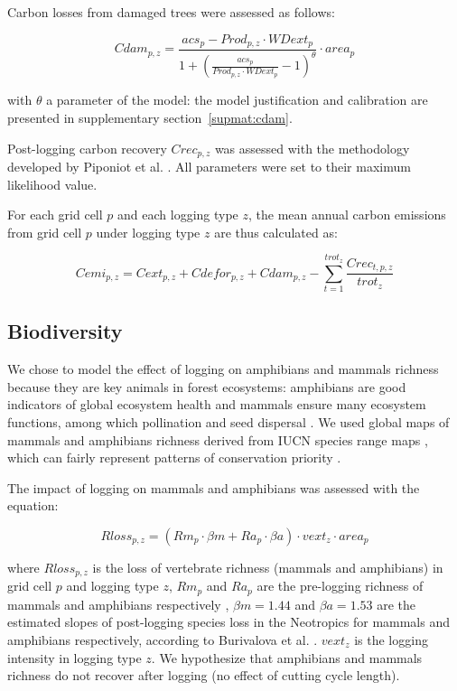 \documentclass{article}
\begin{document}
Carbon losses from damaged trees were assessed as follows: 

\begin{equation}
\label{eq:cdam}
    Cdam_{p,z} = \frac{acs_p  - Prod_{p,z} \cdot WDext_p } {1 + \left(\frac{acs_p}{Prod_{p,z} \cdot WDext_p}  -1 \right)^\theta} \cdot area_p
\end{equation}

with $\theta$ a parameter of the model: the model justification and calibration are presented in supplementary section~\ref{supmat:cdam}. 

Post-logging carbon recovery $Crec_{p,z}$ was assessed with the methodology developed by Piponiot et al. \cite{Piponiot2016a}.  
All parameters were set to their maximum likelihood value. 

For each grid cell $p$ and each logging type $z$, the mean annual carbon emissions from grid cell $p$ under logging type $z$ are thus calculated as: 

\begin{equation}
\label{eq:cemi}
    Cemi_{p,z} = Cext_{p,z} + Cdefor_{p,z} + Cdam_{p,z} -  \sum_{t=1}^{trot_z} \frac{Crec_{t,p,z}}{trot_z} 
\end{equation}

\subsection{Biodiversity}

We chose to model the effect of logging on amphibians and mammals richness because they are key animals in forest ecosystems: amphibians are good indicators of global ecosystem health \cite{Welsh1998,Collins2003} and mammals ensure many ecosystem functions, among which pollination \cite{Fleming2009} and seed dispersal \cite{Wright2000,Muscarella2007}. We used global maps of mammals and amphibians richness derived from IUCN species range maps \cite{Jenkins2013,MapBiodiv}, which can fairly represent patterns of conservation priority \cite{Marechaux2017}.

The impact of logging on mammals and amphibians was assessed with the equation: 

\begin{equation}
\label{eq:rloss}
Rloss_{p,z} = \left(Rm_{p} \cdot \beta m + Ra_{p} \cdot \beta a  \right)  \cdot vext_z \cdot area_p 
\end{equation}

where $Rloss_{p,z}$ is the loss of vertebrate richness (mammals and amphibians) in grid cell $p$ and logging type $z$, $Rm_{p}$ and $Ra_p$ are the pre-logging richness of mammals and amphibians respectively \cite{Jenkins2013}, $\beta m = 1.44$ and $\beta a = 1.53$  are the estimated slopes of post-logging species loss in the Neotropics for mammals and amphibians respectively, according to Burivalova et al.  \cite{Burivalova2014}. $vext_z$ is the logging intensity in logging type $z$.
We hypothesize that amphibians and mammals richness do not recover after logging (no effect of cutting cycle length). 
\end{document}
